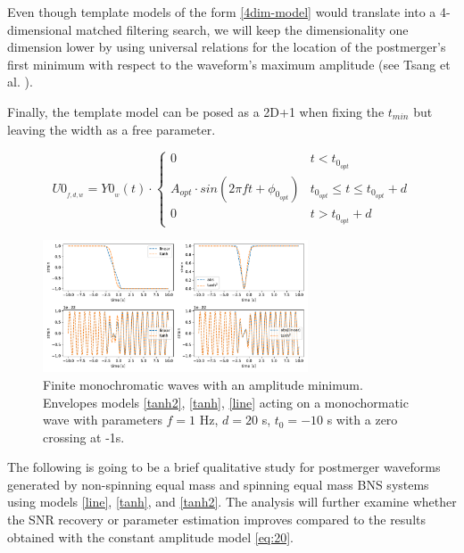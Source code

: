 Even though template models of the form \ref{4dim-model} would translate into a 4-dimensional matched filtering search, we will keep the dimensionality one dimension lower by using universal relations for the location of the postmerger's first minimum with respect to the waveform's maximum amplitude (see Tsang et al. \cite{Tsang:2019esi}). 

Finally, the template model can be posed as a 2D+1 when fixing the $t_{min}$ but leaving the width as a free parameter.

\begin{equation}\label{3dim-model}
U0_{_{f,d, w}} = Y0_{_{w}}(t) \cdot
\begin{cases} 
      0 & t<t_{0_{opt}} \\
      A_{opt} \cdot sin(2\pi f t + \phi_{0_{opt}}) & t_{0_{opt}} \leq t\leq t_{0_{opt}}+d \\
      0 & t>t_{0_{opt}}+d
   \end{cases}
\end{equation}

\begin{figure}[hbt!]
\begin{center}
\includegraphics[width=0.7\textwidth, angle=0]{images/Data_analysis/results/envel.pdf}
\captionsetup{width=0.8\textwidth}
\caption[Finite monochromatic waves with an amplitude minimum]{Finite monochromatic waves with an amplitude minimum. Envelopes models \ref{tanh2}, \ref{tanh}, \ref{line} acting on a monochormatic wave with parameters $f=1$ Hz, $d=20$ s, $t_{0}=-10$ s with a zero crossing at -1s.}
\label{env.ex}
\end{center}
\end{figure}
\FloatBarrier


The following is going to be a brief qualitative study for postmerger waveforms generated by non-spinning equal mass and spinning equal mass BNS systems using models \ref{line}, \ref{tanh}, and \ref{tanh2}. The analysis will further examine whether the SNR recovery or parameter estimation improves compared to the results obtained with the constant amplitude model \ref{eq:20}.


